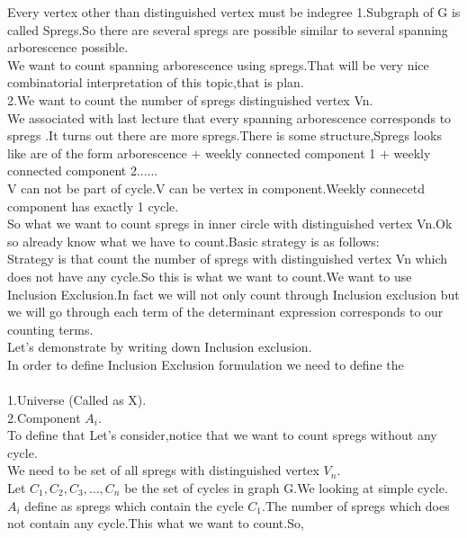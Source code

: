 Every vertex other than distinguished vertex must be indegree 1.Subgraph of G is called Spregs.So there are several spregs are possible similar to several spanning arborescence possible.\\
We want to count spanning arborescence using spregs.That will be very nice combinatorial interpretation of this topic,that is plan.\\

2.We want to count the number of spregs distinguished vertex Vn.\\
We associated with last lecture that every spanning arborescence corresponds to spregs .It turns out there are more spregs.There is some structure,Spregs looks like are of the form arborescence $+$ weekly connected component 1 $+$ weekly connected component 2......\\
V can not be part of cycle.V can be vertex in component.Weekly connecetd component has exactly 1 cycle.\\
So what we want to count spregs in inner circle with distinguished vertex Vn.Ok so already know what we have to count.Basic strategy is as follows:\\
Strategy is that count the number of spregs with distinguished vertex Vn which does not have any cycle.So this is what we want to count.We want to use Inclusion Exclusion.In fact we will not only count through Inclusion exclusion but we will go through each term of the determinant expression corresponds to our counting terms.\\
Let's demonstrate by writing down Inclusion exclusion.\\
In order to define Inclusion Exclusion formulation we need to define the \\ \\
1.Universe (Called as X).\\
2.Component $A_i$.\\
To define that Let's consider,notice that we want to count spregs without any cycle.\\
We need to be set of all spregs with distinguished vertex $V_n$.\\
Let $C_1,C_2,C_3, \dots , C_n$ be the set of cycles in graph G.We looking at simple cycle.\\
$A_i$ define as spregs which contain the cycle $C_1$.The number of spregs which does not contain any cycle.This what we want to count.So,\\

